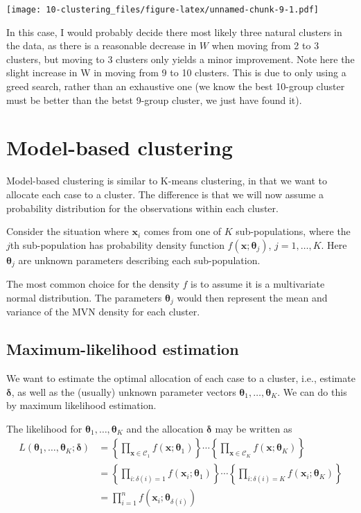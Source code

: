 \documentclass[
]{book}
\theoremstyle{definition}
\theoremstyle{definition}
\theoremstyle{definition}
\theoremstyle{definition}
\theoremstyle{remark}
\begin{document}
\texttt{[image: 10-clustering\_files/figure-latex/unnamed-chunk-9-1.pdf]}

In this case, I would probably decide there most likely three natural clusters in the data, as there is a reasonable decrease in \(W\) when moving from 2 to 3 clusters, but moving to 3 clusters only yields a minor improvement. Note here the slight increase in W in moving from 9 to 10 clusters. This is due to only using a greed search, rather than an exhaustive one (we know the best 10-group cluster must be better than the betst 9-group cluster, we just have found it).

\hypertarget{model-based-clustering}{%
\section{Model-based clustering}\label{model-based-clustering}}

Model-based clustering is similar to K-means clustering, in that we want to allocate each case to a cluster. The difference is that we will now assume a probability distribution for the observations within each cluster.

Consider the situation where \(\mathbf x_i\) comes from one of \(K\) sub-populations, where the \(j\)th sub-population has
probability density function \(f(\mathbf x; \boldsymbol \theta_j)\), \(j=1,\ldots , K\). Here \(\boldsymbol \theta_j\) are unknown parameters describing each sub-population.

The most common choice for the density \(f\) is to assume it is a multivariate normal distribution. The parameters \(\boldsymbol \theta_j\) would then represent the mean and variance of the MVN density for each cluster.

\hypertarget{maximum-likelihood-estimation}{%
\subsection{Maximum-likelihood estimation}\label{maximum-likelihood-estimation}}

We want to estimate the optimal allocation of each case to a cluster, i.e., estimate \(\boldsymbol \delta\), as well as the (usually) unknown parameter vectors \(\boldsymbol \theta_1, \ldots , \boldsymbol \theta_K\). We can do this by maximum likelihood estimation.

The likelihood for \(\boldsymbol \theta_1, \ldots , \boldsymbol \theta_K\) and the allocation \(\boldsymbol \delta\) may be written as
\begin{align*}
L(\boldsymbol \theta_1,\ldots , \boldsymbol \theta_K; \boldsymbol \delta)&=\left \{\prod_{\mathbf x\in \mathcal{C}_1} f(\mathbf x; \boldsymbol \theta_1)\right \}\cdots \left \{\prod_{\mathbf x\in \mathcal{C}_K} f(\mathbf x; \boldsymbol \theta_K)\right \}\\
&=\left \{\prod_{i: \delta(i)=1} f(\mathbf x_i; \boldsymbol \theta_1)\right \}\cdots \left \{\prod_{i: \delta(i)=K} f(\mathbf x_i; \boldsymbol \theta_K)\right \}\\
&= \prod_{i=1}^n f(\mathbf x_i; \boldsymbol \theta_{\delta(i)})
\end{align*}
\end{document}
